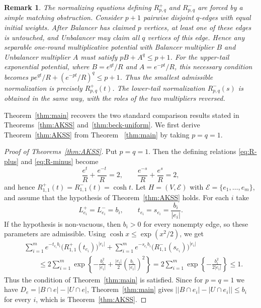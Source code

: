 \documentclass[twoside,12pt]{article}
\numberwithin{equation}{section}
\newtheorem{remark}{Remark}[section]
\begin{document}
\begin{remark}
The normalizing equations defining $R^+_{p,q}$ and $R^-_{p,q}$ are forced by a simple matching obstruction.  Consider $p+1$ pairwise disjoint $q$-edges with equal initial weights.  After Balancer has claimed $p$ vertices, at least one of these edges is untouched, and Unbalancer may claim all $q$ vertices of this edge. Hence any separable one-round multiplicative potential with Balancer multiplier $B$ and Unbalancer multiplier $A$ must satisfy \(pB+A^q\le p+1\). For the upper-tail exponential potential, where \(B=e^{qt}/R\) and \(A=e^{-pt}/R\), this necessary condition becomes \(p e^{qt}/R+(e^{-pt}/R)^q\le p+1\).  Thus the smallest admissible normalization is precisely \(R^+_{p,q}(t)\). The lower-tail normalization \(R^-_{p,q}(s)\) is obtained in the same way, with the roles of the two multipliers reversed.
\end{remark}



Theorem~\ref{thm:main} recovers the two standard comparison results stated in
Theorems~\ref{thm:AKSS} and~\ref{thm:beck-uniform}.  
We first derive Theorem~\ref{thm:AKSS} from Theorem ~\ref{thm:main} by taking $p=q=1$.

\begin{proof}[Proof of Theorems~\ref{thm:AKSS}]
Put $p=q=1$. Then the defining
relations \eqref{eq:R-plus} and \eqref{eq:R-minus} become
\[
        \frac{e^t}{R}+\frac{e^{-t}}{R}=2,
        \qquad
        \frac{e^{-s}}{R}+\frac{e^s}{R}=2,
\]
and hence
$R^+_{1,1}(t)=R^-_{1,1}(t)=\cosh t$.
Let $H=(V,\mathcal E)$ with
$\mathcal E=\{e_1,\ldots,e_m\}$, and assume that the hypothesis of
Theorem~\ref{thm:AKSS} holds.  For each $i$ take
\[
        L_{e_i}^+=L_{e_i}^-=b_i,
        \qquad
        t_{e_i}=s_{e_i}=\frac{b_i}{|e_i|}.
\]
If the hypothesis is non-vacuous, then $b_i>0$ for every nonempty edge, so
these parameters are admissible.  Using $\cosh x\le \exp(x^2/2)$, we get
\[
\begin{aligned}
        &\sum_{i=1}^m e^{-t_{e_i}b_i}
        \bigl(R^+_{1,1}(t_{e_i})\bigr)^{|e_i|}
        +
        \sum_{i=1}^m e^{-s_{e_i}b_i}
        \bigl(R^-_{1,1}(s_{e_i})\bigr)^{|e_i|}       \\
        &\qquad\le
        2\sum_{i=1}^m
        \exp\!\left\{-\frac{b_i^2}{|e_i|}
        +\frac{|e_i|}{2}\left(\frac{b_i}{|e_i|}\right)^2\right\}
        =
        2\sum_{i=1}^m
        \exp\!\left\{-\frac{b_i^2}{2|e_i|}\right\}
        \le 1.
\end{aligned}
\]
Thus the condition of Theorem~\ref{thm:main} is satisfied. Since for
$p=q=1$ we have
$D_e=|B\cap e|-|U\cap e|$, Theorem~\ref{thm:main} gives
$\bigl||B\cap e_i|-|U\cap e_i|\bigr|\le b_i$ for every $i$, which is
Theorem~\ref{thm:AKSS}.
\end{proof}
\end{document}
